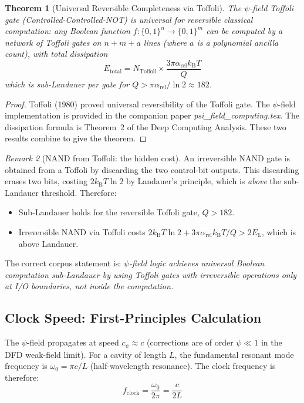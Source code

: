 \documentclass[11pt]{article}
\newtheorem{theorem}{Theorem}[section]
\theoremstyle{definition}
\theoremstyle{remark}
\newtheorem{remark}[theorem]{Remark}
\newcommand{\kB}{k_{\mathrm{B}}}
\newcommand{\EL}{E_{\mathrm{L}}}
\begin{document}
\begin{theorem}[Universal Reversible Completeness via Toffoli]
\label{thm:toffoli_complete}
The $\psi$-field Toffoli gate (Controlled-Controlled-NOT) is universal
for reversible classical computation: any Boolean function
$f: \{0,1\}^n \to \{0,1\}^m$ can be computed by a network of Toffoli
gates on $n + m + a$ lines (where $a$ is a polynomial ancilla count),
with total dissipation
\begin{equation}
E_{\mathrm{total}} = N_{\mathrm{Toffoli}} \times
\frac{3\pi\alpha_{\mathrm{rel}}\kB T}{Q}
\label{eq:toffoli_total}
\end{equation}
which is sub-Landauer per gate for $Q > \pi\alpha_{\mathrm{rel}}/\ln 2 \approx 182$.
\end{theorem}

\begin{proof}
Toffoli (1980) proved universal reversibility of the Toffoli gate.
The $\psi$-field implementation is provided in the companion paper
\textit{psi\_field\_computing.tex}. The dissipation formula is
Theorem~2 of the Deep Computing Analysis. These two results combine
to give the theorem.
\end{proof}

\begin{remark}[NAND from Toffoli: the hidden cost]
An irreversible NAND gate is obtained from a Toffoli by discarding
the two control-bit outputs. This discarding erases two bits, costing
$2\kB T \ln 2$ by Landauer's principle, which is \emph{above} the
sub-Landauer threshold. Therefore:
\begin{itemize}
\item Sub-Landauer holds for the reversible Toffoli gate, $Q > 182$.
\item Irreversible NAND via Toffoli costs $2\kB T \ln 2 +
  3\pi\alpha_{\mathrm{rel}}\kB T/Q > 2\EL$, which is above Landauer.
\end{itemize}
The correct corpus statement is: \emph{$\psi$-field logic achieves
universal Boolean computation sub-Landauer by using Toffoli gates with
irreversible operations only at I/O boundaries, not inside the computation.}
\end{remark}

\subsection{Clock Speed: First-Principles Calculation}
\label{sec:clock_speed}

The $\psi$-field propagates at speed $c_\psi \approx c$ (corrections
are of order $\psi \ll 1$ in the DFD weak-field limit). For a cavity
of length $L$, the fundamental resonant mode frequency is
$\omega_0 = \pi c / L$ (half-wavelength resonance). The clock frequency
is therefore:
\begin{equation}
\boxed{
f_{\mathrm{clock}} = \frac{\omega_0}{2\pi} = \frac{c}{2L}
}
\label{eq:clock_speed}
\end{equation}
\end{document}
